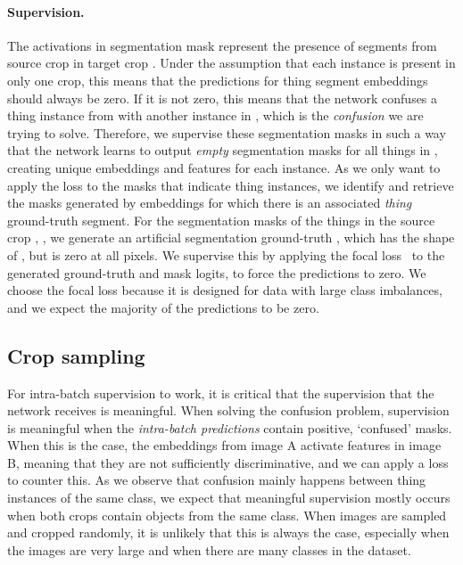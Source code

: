 \documentclass[10pt,twocolumn,letterpaper]{article}
\begin{document}
\paragraph{Supervision.}
The activations in segmentation mask  represent the presence of segments from source crop  in target crop . Under the assumption that each instance is present in only one crop, this means that the predictions for thing segment embeddings should always be zero. If it is not zero, this means that the network confuses a thing instance from  with another instance in , which is the \textit{confusion} we are trying to solve. Therefore, we supervise these segmentation masks in such a way that the network learns to output \textit{empty} segmentation masks for all things in , creating unique embeddings and features for each instance. As we only want to apply the loss to the masks that indicate thing instances, we identify and retrieve the masks generated by embeddings  for which there is an associated \textit{thing} ground-truth segment. For the segmentation masks of the  things in the source crop , , we generate an artificial segmentation ground-truth , which has the shape of , but is zero at all pixels. We supervise this by applying the focal loss~\cite{lin2017focal} to the generated ground-truth and mask logits, to force the predictions to zero. We choose the focal loss because it is designed for data with large class imbalances, and we expect the majority of the predictions to be zero. 


\subsection{Crop sampling}
For intra-batch supervision to work, it is critical that the supervision that the network receives is meaningful. When solving the confusion problem, supervision is meaningful when the \textit{intra-batch predictions}  contain positive, `confused' masks. When this is the case, the embeddings from image A activate features in image B, meaning that they are not sufficiently discriminative, and we can apply a loss to counter this. As we observe that confusion mainly happens between thing instances of the same class, we expect that meaningful supervision mostly occurs when both crops contain objects from the same class. When images are sampled and cropped randomly, it is unlikely that this is always the case, especially when the images are very large and when there are many classes in the dataset. 
\end{document}
